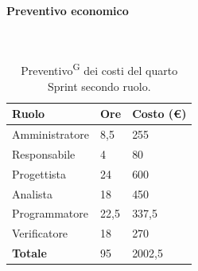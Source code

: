 \documentclass[8pt]{article}
\newcommand{\glossterm}[1]{#1\textsuperscript{G}} %
\newcommand{\subsubsubsection}[1]{\paragraph{#1}\mbox{}\\}
\begin{document}
\subsubsubsection{Preventivo economico}
\begin{table}[ht!]
	\centering
	\begin{tabular}{p{4cm} p{1cm} p{2cm}}
        \toprule
        \textbf{Ruolo} & \textbf{Ore} & \textbf{Costo (€)} \\
        \midrule
        Amministratore & 8,5 & 255 \\
        Responsabile & 4 & 80 \\
        Progettista & 24 & 600 \\
        Analista & 18 & 450 \\
        Programmatore & 22,5 & 337,5 \\
        Verificatore & 18 & 270 \\
        \bottomrule
        \textbf{Totale} & 95 & 2002,5
    \end{tabular}
    \caption{\glossterm{Preventivo} dei costi del quarto Sprint secondo ruolo.}
	\label{table:Preventivo dei costi del quarto Sprint secondo ruolo}
\end{table}
\end{document}
